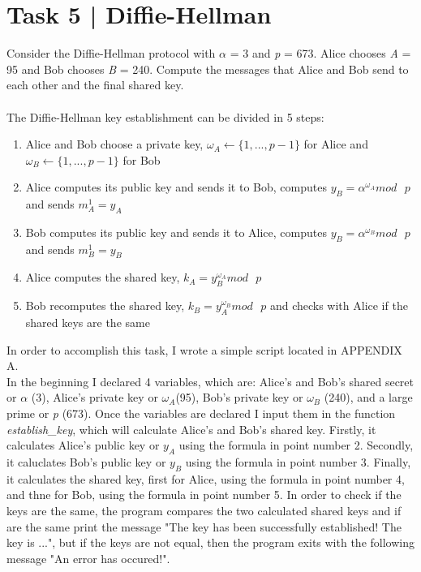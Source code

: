 \documentclass{article}
\begin{document}
\section*{Task 5 | Diffie-Hellman}
Consider the Diffie-Hellman protocol with $\alpha$ = 3 and \textit{p} = 673. Alice chooses
\textit{A} = 95 and Bob chooses \textit{B} = 240. Compute the messages that Alice and Bob
send to each other and the final shared key. \\\\
The Diffie-Hellman key establishment can be divided in 5 steps:
\begin{enumerate} 
    \item Alice and Bob choose a private key,
        $\omega_A\leftarrow \{1, ..., p - 1\}$ for Alice and $\omega_B\leftarrow \{1, ..., p - 1\}$ for Bob
    \item Alice computes its public key and sends it to Bob, computes $y_B = \alpha^{\omega_A} mod\text{  }p$ 
        and sends $m_A^1 = y_A$
    \item Bob computes its public key and sends it to Alice, computes $y_B = \alpha^{\omega_B} mod\text{  }p$ 
        and sends $m_B^1 = y_B$
    \item Alice computes the shared key, $k_A = y_B^{\omega_A} mod \text{  }p$
    \item Bob recomputes the shared key, $k_B = y_A^{\omega_B} mod \text{  }p$ and checks 
        with Alice if the shared keys are the same
\end{enumerate}
In order to accomplish this task, I wrote a simple script located in APPENDIX A. \\
In the beginning I declared 4 variables, which are: Alice's and Bob's shared secret
or $\alpha$ (3), Alice's private key or $\omega_A$(95), Bob's private key or $\omega_B$
(240), and a large prime or \textit{p} (673). Once the variables are declared I input
them in the function \textit{establish\_key}, which will calculate Alice's and Bob's shared key.
Firstly, it calculates Alice's public key or $y_A$ using the formula in point number 2.
Secondly, it caluclates Bob's public key or $y_B$ using the formula in point number 3.
Finally, it calculates the shared key, first for Alice, using the formula in point number 4, and
thne for Bob, using the formula in point number 5. In order to check if the keys
are the same, the program compares the two calculated shared keys and if are the 
same print the message "The key has been successfully established! The key is ...", but 
if the keys are not equal, then the program exits with the following message "An error has occured!".
\end{document}
